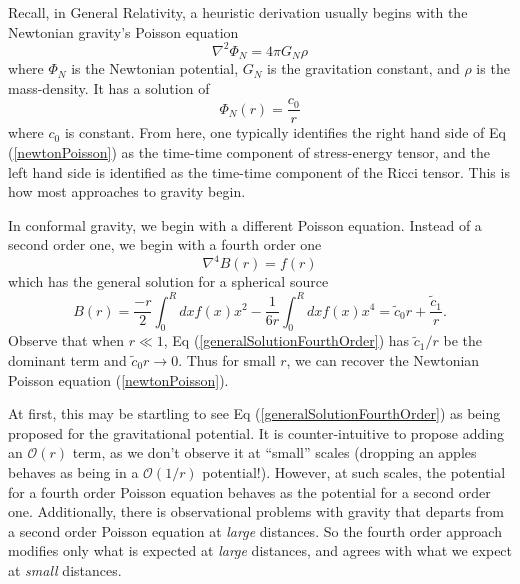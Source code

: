 Recall, in General Relativity, a heuristic derivation usually begins
with the Newtonian gravity's Poisson equation
\begin{equation}\label{newtonPoisson}
\nabla^{2}\Phi_{N} = 4\pi G_{N}\rho
\end{equation}
where $\Phi_{N}$ is the Newtonian potential, $G_{N}$ is the
gravitation constant, and $\rho$ is the mass-density. It has a
solution of
\begin{equation}\label{generalSolutionSecondOrder}
\Phi_{N}(r) = \frac{c_{0}}{r}
\end{equation}
where $c_{0}$ is constant.
From here, one typically identifies the right hand side of Eq
(\ref{newtonPoisson}) as the time-time component of stress-energy
tensor, and the left hand side is identified as the time-time
component of the Ricci tensor. This is how most approaches to gravity begin.

In conformal gravity, we begin with a different Poisson
equation. Instead of a second order one, we begin with a fourth order
one~\cite{Mannheim:1994ph}
\begin{equation}\label{fourthOrderPoisson}
\nabla^{4}B(r) = f(r)
\end{equation}
which has the general solution for a spherical source
\begin{equation}\label{generalSolutionFourthOrder}
B(r) = \frac{-r}{2}\int^{R}_{0}dxf(x)x^{2} -
\frac{1}{6r}\int^{R}_{0}dxf(x)x^{4} = \widetilde{c}_{0}r + \frac{\widetilde{c}_{1}}{r}.
\end{equation}
Observe that when $r\ll 1$, Eq (\ref{generalSolutionFourthOrder}) has
$\widetilde{c}_{1}/r$ be the dominant term and
$\widetilde{c}_{0}r\to 0$. Thus for small $r$, we can recover the
Newtonian Poisson equation (\ref{newtonPoisson}).

At first, this may be startling to see Eq
(\ref{generalSolutionFourthOrder}) as being proposed for the
gravitational potential. It is counter-intuitive to propose adding an
$\mathcal{O}(r)$ term, as we don't observe it at ``small'' scales
(dropping an apples behaves as being in a $\mathcal{O}(1/r)$
potential!). However, at such scales, the potential for
a fourth order Poisson equation behaves as the potential for a second
order one. Additionally, there is observational problems with gravity
that departs from a second order Poisson equation at \emph{large}
distances. So the fourth order approach modifies only what is expected
at \emph{large} distances, and agrees with what we expect at
\emph{small} distances.

